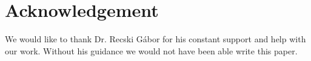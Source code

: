 \chapter{Acknowledgement}
We would like to thank Dr. Recski Gábor for his constant support and help with our work. Without his guidance we would not have been able write this paper.
